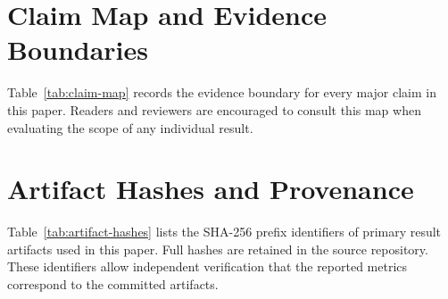 \documentclass[runningheads]{llncs}
\begin{document}
\begingroup
\small


\endgroup

\appendix

\section{Claim Map and Evidence Boundaries}
\label{app:claim_map}
Table~\ref{tab:claim-map} records the evidence boundary for every major claim in this paper.
Readers and reviewers are encouraged to consult this map when evaluating the scope of any
individual result.


\section{Artifact Hashes and Provenance}
\label{app:hashes}
Table~\ref{tab:artifact-hashes} lists the SHA-256 prefix identifiers of primary result
artifacts used in this paper. Full hashes are retained in the source repository.
These identifiers allow independent verification that the reported metrics correspond
to the committed artifacts.

\end{document}
